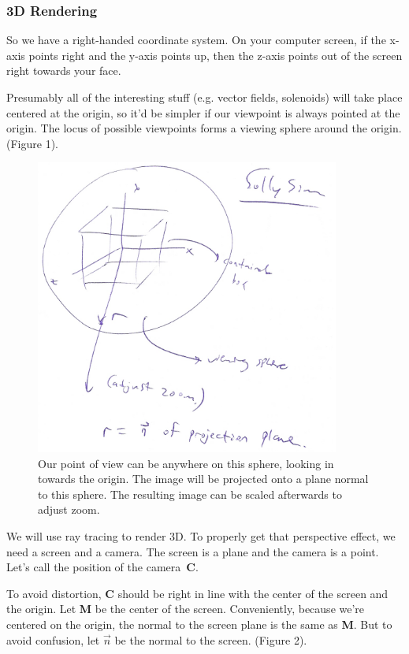\documentclass[12pt]{article}
\begin{document}
	\subsubsection*{3D Rendering}
	
	So we have a right-handed coordinate system. On your computer screen, if the x-axis points right and the y-axis points up, then the z-axis points out of the screen right towards your face.
	
	Presumably all of the interesting stuff (e.g. vector fields, solenoids) will take place centered at the origin, so it'd be simpler if our viewpoint is always pointed at the origin. The locus of possible viewpoints forms a viewing sphere around the origin. (Figure 1).
	
		\begin{figure}[ht!] 
		\centering
		\includegraphics[width=10cm]{1.png}
		\caption{Our point of view can be anywhere on this sphere, looking in towards the origin. The image will be projected onto a plane normal to this sphere. The resulting image can be scaled afterwards to adjust zoom.} \label{im:1}		
		\end{figure}
	
	We will use ray tracing to render 3D. To properly get that perspective effect, we need a screen and a camera. The screen is a plane and the camera is a point. Let's call the position of the camera~\textbf{C}. 
	
	To avoid distortion, \textbf{C} should be right in line with the center of the screen and the origin. Let \textbf{M} be the center of the screen. Conveniently, because we're centered on the origin, the normal to the screen plane is the same as \textbf{M}. But to avoid confusion, let $\vec{n}$ be the normal to the screen. (Figure 2).
\end{document}
